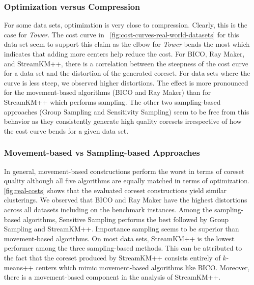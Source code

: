 \subsubsection*{Optimization versus Compression}
For some data sets, optimization is very close to compression. 
Clearly, this is the case for \textit{Tower}. The cost curve in ~\cref{fig:cost-curves-real-world-datasets} for this data set seem to support this claim as the elbow for \textit{Tower} bends the most which indicates that adding more centers help reduce the cost. For BICO, Ray Maker, and StreamKM++, there is a correlation between the steepness of the cost curve for a data set and the distortion of the generated coreset. For data sets where the curve is less steep, we observed higher distortions. The effect is more pronounced for the movement-based algorithms (BICO and Ray Maker) than for StreamKM++ which performs sampling. The other two sampling-based approaches (Group Sampling and Sensitivity Sampling) seem to be free from this behavior as they consistently generate high quality coresets irrespective of how the cost curve bends for a given data set.

\subsubsection*{Movement-based vs Sampling-based Approaches}
In general, movement-based constructions perform the worst in terms of coreset quality although all five algorithms are equally matched in terms of optimization. \cref{fig:real-costs} shows that the evaluated coreset constructions yield similar clusterings.
We observed that BICO and Ray Maker have the highest distortions across all datasets including on the benchmark instances. Among the sampling-based algorithms, Sensitive Sampling performs the best followed by Group Sampling and StreamKM++. Importance sampling seems to be superior than movement-based algorithms. On most data sets, StreamKM++ is the lowest performer among the three sampling-based methods. This can be attributed to the fact that the coreset produced by StreamKM++ consists entirely of $k$-means++ centers which mimic movement-based algorithms like BICO. Moreover, there is a movement-based component in the analysis of StreamKM++.





